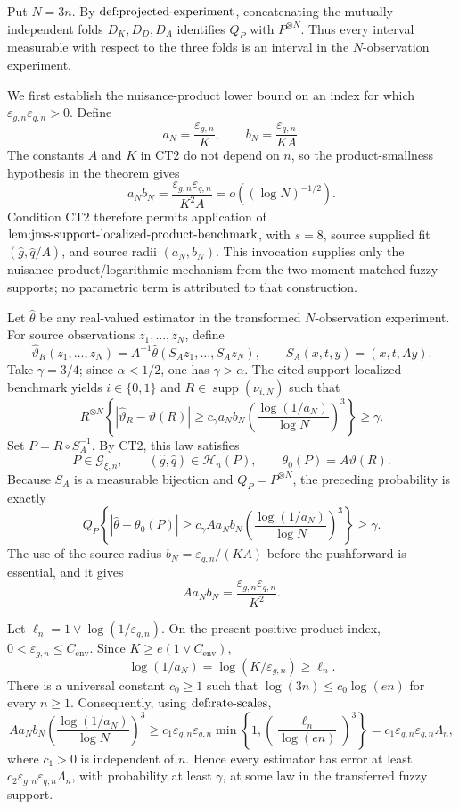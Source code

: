 Put \(N=3n\).  By \(\textup{def:projected-experiment}\), concatenating the mutually independent folds \(D_K,D_D,D_A\) identifies \(Q_P\) with \(P^{\otimes N}\).  Thus every interval measurable with respect to the three folds is an interval in the \(N\)-observation experiment.

We first establish the nuisance-product lower bound on an index for which \(\varepsilon_{g,n}\varepsilon_{q,n}>0\).  Define
\[
 a_N=\frac{\varepsilon_{g,n}}{K},
 \qquad
 b_N=\frac{\varepsilon_{q,n}}{KA}.
\]
The constants \(A\) and \(K\) in \(\mathrm{CT2}\) do not depend on \(n\), so the product-smallness hypothesis in the theorem gives
\[
 a_Nb_N
 =\frac{\varepsilon_{g,n}\varepsilon_{q,n}}{K^2A}
 =o\!\left((\log N)^{-1/2}\right).
\]
Condition \(\mathrm{CT2}\) therefore permits application of \(\textup{lem:jms-support-localized-product-benchmark}\), with \(s=8\), source supplied fit \((\widehat g,\widehat q/A)\), and source radii \((a_N,b_N)\).  This invocation supplies only the nuisance-product/logarithmic mechanism from the two moment-matched fuzzy supports; no parametric term is attributed to that construction.

Let \(\widehat\theta\) be any real-valued estimator in the transformed \(N\)-observation experiment.  For source observations \(z_1,\ldots,z_N\), define
\[
 \widehat\vartheta_R(z_1,\ldots,z_N)
 =A^{-1}\widehat\theta(S_Az_1,\ldots,S_Az_N),
 \qquad S_A(x,t,y)=(x,t,Ay).
\]
Take \(\gamma=3/4\); since \(\alpha<1/2\), one has \(\gamma>\alpha\).  The cited support-localized benchmark yields \(i\in\{0,1\}\) and \(R\in\operatorname{supp}(\nu_{i,N})\) such that
\[
 R^{\otimes N}\!\left\{
 \left|\widehat\vartheta_R-\vartheta(R)\right|
 \ge c_\gamma a_Nb_N
 \left(\frac{\log(1/a_N)}{\log N}\right)^3
 \right\}\ge\gamma .
\]
Set \(P=R\circ S_A^{-1}\).  By \(\mathrm{CT2}\), this law satisfies
\[
 P\in\mathcal G_{\xi,n},
 \qquad
 (\widehat g,\widehat q)\in\mathcal H_n(P),
 \qquad
 \theta_0(P)=A\vartheta(R).
\]
Because \(S_A\) is a measurable bijection and \(Q_P=P^{\otimes N}\), the preceding probability is exactly
\[
 Q_P\!\left\{
 \left|\widehat\theta-\theta_0(P)\right|
 \ge c_\gamma A a_Nb_N
 \left(\frac{\log(1/a_N)}{\log N}\right)^3
 \right\}\ge\gamma .
\]
The use of the source radius \(b_N=\varepsilon_{q,n}/(KA)\) before the pushforward is essential, and it gives
\[
 A a_Nb_N
 =\frac{\varepsilon_{g,n}\varepsilon_{q,n}}{K^2}.
\]

Let \(\ell_n=1\vee\log(1/\varepsilon_{g,n})\).  On the present positive-product index, \(0<\varepsilon_{g,n}\le C_{\mathrm{env}}\).  Since \(K\ge e(1\vee C_{\mathrm{env}})\),
\[
 \log(1/a_N)=\log(K/\varepsilon_{g,n})\ge\ell_n.
\]
There is a universal constant \(c_0\ge1\) such that \(\log(3n)\le c_0\log(en)\) for every \(n\ge1\).  Consequently, using \(\textup{def:rate-scales}\),
\[
 A a_Nb_N
 \left(\frac{\log(1/a_N)}{\log N}\right)^3
 \ge c_1\varepsilon_{g,n}\varepsilon_{q,n}
 \min\!\left\{1,
 \left(\frac{\ell_n}{\log(en)}\right)^3\right\}
 =c_1\varepsilon_{g,n}\varepsilon_{q,n}\Lambda_n,
\]
where \(c_1>0\) is independent of \(n\).  Hence every estimator has error at least \(c_2\varepsilon_{g,n}\varepsilon_{q,n}\Lambda_n\), with probability at least \(\gamma\), at some law in the transferred fuzzy support.

